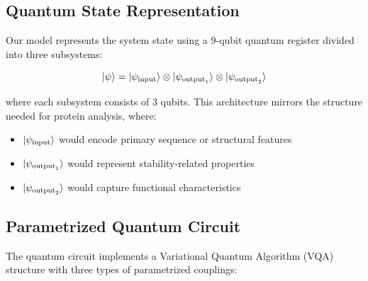 \documentclass[11pt,a4paper]{article}
\begin{document}
\subsection{Quantum State Representation}

Our model represents the system state using a 9-qubit quantum register divided into three subsystems:

\begin{equation}
\ket{\psi} = \ket{\psi_{\text{input}}} \otimes \ket{\psi_{\text{output}_1}} \otimes \ket{\psi_{\text{output}_2}}
\end{equation}

where each subsystem consists of 3 qubits. This architecture mirrors the structure needed for protein analysis, where:
\begin{itemize}
    \item $\ket{\psi_{\text{input}}}$ would encode primary sequence or structural features
    \item $\ket{\psi_{\text{output}_1}}$ would represent stability-related properties
    \item $\ket{\psi_{\text{output}_2}}$ would capture functional characteristics
\end{itemize}

\subsection{Parametrized Quantum Circuit}

The quantum circuit implements a Variational Quantum Algorithm (VQA) structure with three types of parametrized couplings:
\end{document}
